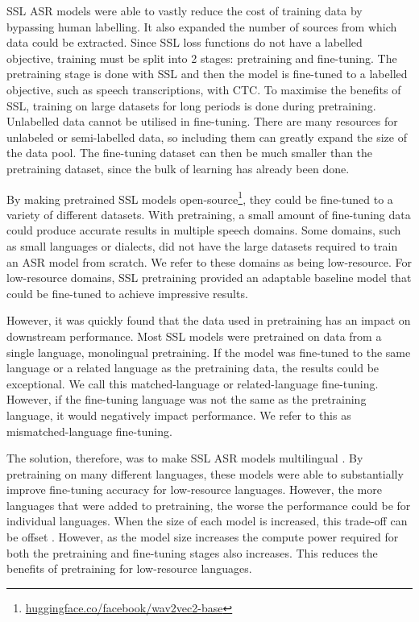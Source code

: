 SSL ASR models were able to vastly reduce the cost of training data by bypassing human labelling. It also expanded the number of sources from which data could be extracted. Since SSL loss functions do not have a labelled objective, training must be split into 2 stages: pretraining and fine-tuning. The pretraining stage is done with SSL and then the model is fine-tuned to a labelled objective, such as speech transcriptions, with CTC. To maximise the benefits of SSL, training on large datasets for long periods is done during pretraining. Unlabelled data cannot be utilised in fine-tuning. There are many resources for unlabeled or semi-labelled data, so including them can greatly expand the size of the data pool. The fine-tuning dataset can then be much smaller than the pretraining dataset, since the bulk of learning has already been done.

By making pretrained SSL models open-source\footnote{\hyperlink{https://huggingface.co/facebook/wav2vec2-base}{huggingface.co/facebook/wav2vec2-base}}, they could be fine-tuned to a variety of different datasets. With pretraining, a small amount of fine-tuning data could produce accurate results in multiple speech domains. Some domains, such as small languages or dialects, did not have the large datasets required to train an ASR model from scratch. We refer to these domains as being low-resource. For low-resource domains, SSL pretraining provided an adaptable baseline model that could be fine-tuned to achieve impressive results.

However, it was quickly found that the data used in pretraining has an impact on downstream performance. Most SSL models were pretrained on data from a single language, monolingual pretraining. If the model was fine-tuned to the same language or a related language as the pretraining data, the results could be exceptional. We call this matched-language or related-language fine-tuning. However, if the fine-tuning language was not the same as the pretraining language, it would negatively impact performance. We refer to this as mismatched-language fine-tuning.

The solution, therefore, was to make SSL ASR models multilingual \cite{XLSR-53, whisper}. By pretraining on many different languages, these models were able to substantially improve fine-tuning accuracy for low-resource languages. However, the more languages that were added to pretraining, the worse the performance could be for individual languages. When the size of each model is increased, this trade-off can be offset \cite{babu2021xlsr}. However, as the model size increases the compute power required for both the pretraining and fine-tuning stages also increases. This reduces the benefits of pretraining for low-resource languages. 

